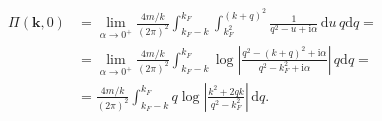 \documentclass[english, parskip=full]{scrartcl}
\newcommand{\intx}{}
\newcommand{\klam}{}
\renewcommand{\i}{\text{i}}
\begin{document}
\begin{align}
\Pi(\textbf{k},0) &= \lim_{\alpha \rightarrow 0^+} \frac{4m/k}{(2\pi)^2} \intx\int_{k_F - k}^{k_F} \intx\int_{k_F^2}^{(k+q)^2} \frac{1}{q^2 - u + \i\alpha} \,\mathrm{d}u \, q\mathrm{d}q = \\
&= \lim_{\alpha \rightarrow 0^+} \frac{4m/k}{(2\pi)^2} \intx\int_{k_F - k}^{k_F} \log \left\vert \frac{q^2 - (k+q)^2 + \i\alpha}{q^2 - k_F^2 + \i\alpha} \right\vert \, q\mathrm{d}q = \\
&= \frac{4m/k}{(2\pi)^2} \intx\int_{k_F - k}^{k_F} q \log \left\vert \frac{k^2 + 2qk}{q^2 - k_F^2} \right\vert \,\mathrm{d}q.
\end{align}
\end{document}
